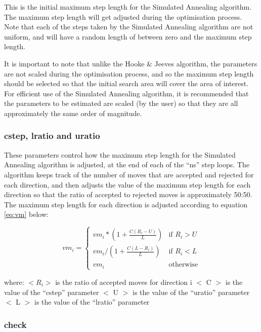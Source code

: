 \documentclass[]{book}
\begin{document}
This is the initial maximum step length for the Simulated Annealing
algorithm. The maximum step length will get adjusted during the
optimisation process. Note that each of the steps taken by the Simulated
Annealing algorithm are not uniform, and will have a random length of
between zero and the maximum step length.

It is important to note that unlike the Hooke \& Jeeves algorithm, the
parameters are not scaled during the optimisation process, and so the
maximum step length should be selected so that the initial search area
will cover the area of interest. For efficient use of the Simulated
Annealing algorithm, it is recommended that the parameters to be
estimated are scaled (by the user) so that they are all approximately
the same order of magnitude.

\hypertarget{cstep-lratio-and-uratio}{%
\subsubsection{cstep, lratio and uratio}\label{cstep-lratio-and-uratio}}

These parameters control how the maximum step length for the Simulated
Annealing algorithm is adjusted, at the end of each of the ``ns'' step
loops. The algorithm keeps track of the number of moves that are
accepted and rejected for each direction, and then adjusts the value of
the maximum step length for each direction so that the ratio of accepted
to rejected moves is approximately 50:50. The maximum step length for
each direction is adjusted according to
equation \eqref{eq:vm}
below:

\begin{equation}
\label{eq:vm}
vm_{i} =
\begin{cases}
vm_{i} * (1 + \frac{C (R_{i} - U)}{L}) & \textrm{if $R_{i} > U$} \\
vm_{i} / (1 + \frac{C (L - R_{i})}{L}) & \textrm{if $R_{i} < L$} \\
vm_{i} & \textrm{otherwise}
\end{cases}\end{equation}

where: \(< R_{i} >\) is the ratio of accepted moves for direction i \(<\) C
\(>\) is the value of the ``cstep'' parameter \(<\) U \(>\) is the value of the
``uratio'' parameter \(<\) L \(>\) is the value of the ``lratio'' parameter

\hypertarget{check}{%
\subsubsection{check}\label{check}}
\end{document}
